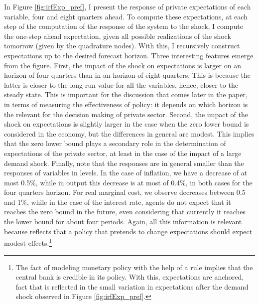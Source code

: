 \documentclass[12pt]{article}
\numberwithin{equation}{section}
\begin{document}
In Figure \ref{fig:irfExp_pref}, I present the response of private expectations of each variable, four and eight quarters ahead. To compute these expectations, at each step of the computation of the response of the system to the shock, I compute the one-step ahead expectation, given all possible realizations of the shock tomorrow (given by the quadrature nodes). With this, I recursively construct expectations up to the desired forecast horizon. Three interesting features emerge from the figure. First, the impact of the shock on expectations is larger on an horizon of four quarters than in an horizon of eight quarters. This is because the latter is closer to the long-run value for all the variables, hence, closer to the steady state. This is important for the discussion that comes later in the paper, in terms of measuring the effectiveness of policy: it depends on which horizon is the relevant for the decision making of private sector. Second, the impact of the shock on expectations is slightly larger in the case when the zero lower bound is considered in the economy, but the differences in general are modest. This implies that the zero lower bound plays a secondary role in the determination of expectations of the private sector, at least in the case of the impact of a large demand shock. Finally, note that the responses are in general smaller than the responses of variables in levels. In the case of inflation, we have a decrease of at most 0.5\%, while in output this decrease is at most of 0.4\%, in both cases for the four quarters horizon. For real marginal cost, we observe decreases between 0.5 and 1\%, while in the case of the interest rate, agents do not expect that it reaches the zero bound in the future, even considering that currently it reaches the lower bound for about four periods. Again, all this information is relevant because reflects that a policy that pretends to change expectations should expect modest effects.\footnote{The fact of modeling monetary policy with the help of a rule implies that the central bank is credible in its policy. With this, expectations are anchored, fact that is reflected in the small variation in expectations after the demand shock observed in Figure \ref{fig:irfExp_pref}.}

\end{document}
